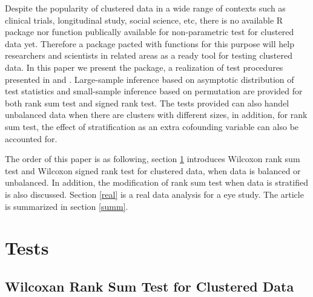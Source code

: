 \documentclass[nojss]{jss}\usepackage[]{graphicx}\usepackage[]{color}
\begin{document}
Despite the popularity of clustered data in
a wide range of contexts such as
clinical trials, longitudinal study,
social science, etc,
there is no available R package nor function
publically available for
non-parametric test for clustered data yet.
Therefore a package pacted with
functions for this purpose will help
researchers and scientists
in related areas as a ready tool
for testing clustered data.
In this paper we present the 
package, a
realization of test procedures presented
in \citet{Rosn:GLyn:Lee:inco:2003}
and \citet{Roxn:Glyn:Lee:wilc:2006}.
Large-sample inference based on asymptotic
distribution of test statistics and
small-sample inference based on permutation
are provided for both rank sum test and
signed rank test. The tests provided
can also handel unbalanced data when
there are clusters with different sizes,
in addition, for rank sum test, the
effect of
stratification as an extra cofounding
variable can also be accounted for.



The order of this paper is as following,
section \ref{test} introduces Wilcoxon rank
sum test and Wilcoxon signed rank test
for clustered data, when data is balanced
or unbalanced. In addition, the modification
of rank sum test when data is stratified
is also discussed. Section \ref{real} is a real
data analysis for a eye study. The article
is summarized in section \ref{summ}.




\section{Tests}
\label{test}


\subsection{Wilcoxan Rank Sum Test for Clustered Data}
\label{rank}
\end{document}
